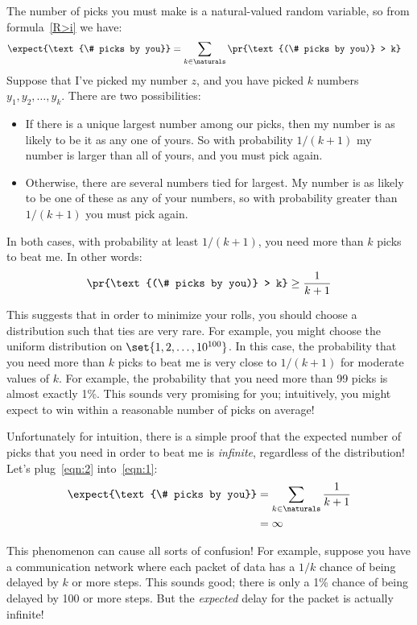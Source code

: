 The number of picks you must make is a natural-valued random variable, so
from formula~\eqref{R>i} we have:
\begin{align}
\expect{\text{\# picks by you}}
    & = \sum_{k \in \naturals} \pr{\text{(\# picks by you)} > k} \label{eqn:1}
\end{align}
Suppose that I've picked my number $z$, and you have picked $k$
numbers $y_1, y_2, \dots, y_k$.  There are two possibilities:
%
\begin{itemize}

\item If there is a unique largest number among our picks, then my
number is as likely to be it as any one of yours.  So with probability
$1/(k+1)$ my number is larger than all of yours, and you must pick
again.

\item Otherwise, there are several numbers tied for largest.  My
number is as likely to be one of these as any of your numbers, so with
probability greater than $1/(k+1)$ you must pick again.

\end{itemize}
%
In both cases, with probability at least $1/(k+1)$, you need more than
$k$ picks to beat me.  In other words:
%
\begin{align}
\pr{\text{(\# picks by you)} > k} \geq \frac{1}{k+1} \label{eqn:2}
\end{align}

This suggests that in order to minimize your rolls, you should choose a
distribution such that ties are very rare.  For example, you might
choose the uniform distribution on $\set{1, 2, \dots, 10^{100}}$.  In
this case, the probability that you need more than $k$ picks to beat
me is very close to $1/(k+1)$ for moderate values of $k$.  For
example, the probability that you need more than 99 picks is almost
exactly 1\%.  This sounds very promising for you; intuitively, you
might expect to win within a reasonable number of picks on average!

Unfortunately for intuition, there is a simple proof that the expected
number of picks that you need in order to beat me is
\textit{infinite}, regardless of the distribution!  Let's
plug~\eqref{eqn:2} into~\eqref{eqn:1}:
%
\begin{align*}
\expect{\text{\# picks by you}}
    & = \sum_{k \in \naturals} \frac{1}{k+1} \\
    & = \infty
\end{align*}

This phenomenon can cause all sorts of confusion!  For example,
suppose you have a communication network where each packet of data has
a $1/k$ chance of being delayed by $k$ or more steps.  This sounds
good; there is only a 1\% chance of being delayed by 100 or more
steps.  But the \textit{expected} delay for the packet is actually
infinite!


